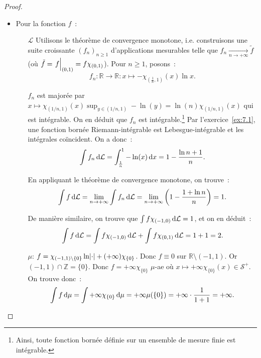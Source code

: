 \documentclass{article}
\newcommand{\restr}[2]{\left.#1\vphantom{\big|}\right|_{#2}}
\newcommand{\pinfty}{{+\infty}}
\newcommand{\Z}{{\mathbb Z}}
\newcommand{\R}{{\mathbb R}}
\begin{document}
\begin{proof}~
\begin{itemize}
	\item Pour la fonction $f$~:
	\begin{itemize}
		\item[$\mathcal L$] Utilisons le théorème de convergence monotone, i.e. construisons une suite croissante $(f_n)_{n \geq 1}$ d'applications mesurables telle que
		$f_n \xrightarrow[n \to \pinfty]{} \tilde f$ (où $\tilde f = \restr f{(0, 1)} = f\chi_{(0, 1)}$). Pour $n \geq 1$, posons~:
		\[f_n : \R \to \R : x \mapsto -\chi_{(\frac 1n, 1)}(x)\ln x.\]

		$f_n$ est majorée par $x \mapsto \chi_{(1/n, 1)}(x)\sup_{y \in (1/n, 1)}-\ln(y) = \ln(n)\chi_{(1/n, 1)}(x)$ qui est intégrable. On en déduit que $f_n$ est intégrable.\footnote{
		Ainsi, toute fonction bornée définie sur un ensemble de mesure finie est intégrable.} Par l'exercice~\ref{ex:7.1}, une fonction bornée Riemann-intégrable est Lebesgue-intégrable et
		les intégrales coïncident. On a donc~:
		\[\int f_n\dif\mathcal L = \int_{\frac 1n}^1-\ln(x)\dif x = 1 - \frac {\ln n+1}n.\]

		En appliquant le théorème de convergence monotone, on trouve~:
		\[\int f\dif\mathcal L = \lim_{n \to \pinfty}\int f_n\dif\mathcal L = \lim_{n \to \pinfty}\left(1 - \frac {1+\ln n}n\right) = 1.\]

		De manière similaire, on trouve que $\int f\chi_{(-1, 0)}\dif\mathcal L = 1$, et on en déduit~:
		\[\int f\dif\mathcal L = \int f\chi_{(-1, 0)}\dif\mathcal L + \int f\chi_{(0, 1)}\dif\mathcal L = 1+1 = 2.\]
		\item[$\mu$:]       $f = \chi_{(-1, 1) \setminus \{0\}}\ln\abs \cdot + (\pinfty)\chi_{\{0\}}$. Donc $f \equiv 0$ sur $\R \setminus (-1, 1)$. Or $(-1, 1) \cap \Z = \{0\}$.
		Donc $f = \pinfty\chi_{\{0\}}$ $\mu$-ae où $x \mapsto \pinfty\chi_{\{0\}}(x) \in \mathcal S^+$. On trouve donc~:
		\[\int f\dif\mu = \int \pinfty\chi_{\{0\}}\dif\mu = \pinfty\mu(\{0\}) = \pinfty \cdot \frac 1{1+1} = \pinfty.\]


\end{itemize}
\end{itemize}
\end{proof}
\end{document}
